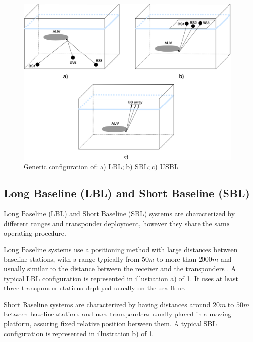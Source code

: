\begin{figure}[!htbp]
	\centering
	\includegraphics[width=1\textwidth]{figures/lblsblusbl}
	\caption{Generic configuration of: a) LBL; b) SBL; c) USBL}
	\label{fig:lblsblusbl}
\end{figure}

\subsection{Long Baseline (LBL) and Short Baseline (SBL)}

Long Baseline (LBL) and Short Baseline (SBL) systems are characterized by different ranges and transponder deployment, however they share the same operating procedure.

Long Baseline systems use a positioning method with large distances between baseline stations, with a range typically from $50m$ to more than $2000m$ and usually similar to the distance between the receiver and the transponders \cite{crosscorr}. A typical LBL configuration is represented in illustration a) of \ref{fig:lblsblusbl}. It uses at least three transponder stations deployed usually on the sea floor.

Short Baseline systems are characterized by having distances around $20m$ to $50m$ between baseline stations \cite{survey-tech-chall} and uses transponders usually placed in a moving platform, assuring fixed relative position between them. A typical SBL configuration is represented in illustration b) of \ref{fig:lblsblusbl}.

